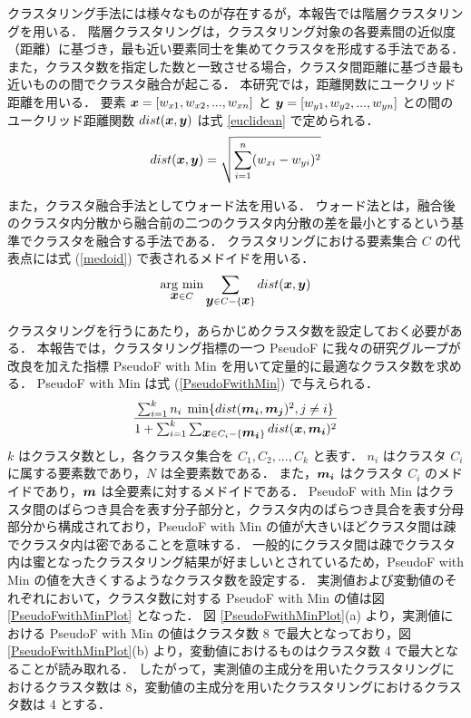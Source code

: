\documentclass[technicalreport]{ieicej}
\begin{document}
クラスタリング手法には様々なものが存在するが，本報告では階層クラスタリングを用いる\cite{fraley1998many}．
階層クラスタリングは，クラスタリング対象の各要素間の近似度（距離）に基づき，最も近い要素同士を集めてクラスタを形成する手法である．
また，クラスタ数を指定した数と一致させる場合，クラスタ間距離に基づき最も近いものの間でクラスタ融合が起こる．
本研究では，距離関数にユークリッド距離を用いる．
要素 $\mbox{\boldmath $x$} = [w_{x1},w_{x2},...,w_{xn}]$ と $\mbox{\boldmath $y$} = [w_{y1},w_{y2},...,w_{yn}]$ との間のユークリッド距離関数 $dist(\mbox{\boldmath $x$},\mbox{\boldmath $y$})$ は式 \ref{euclidean} で定められる．
\begin{equation}
dist(\mbox{\boldmath $x$},\mbox{\boldmath $y$}) = \sqrt{\sum^n_{i=1}( w_{xi} - w_{yi} )^2}
\label{euclidean}
\end{equation}

また，クラスタ融合手法としてウォード法\cite{murtagh2014ward}を用いる．
ウォード法とは，融合後のクラスタ内分散から融合前の二つのクラスタ内分散の差を最小とするという基準でクラスタを融合する手法である．
クラスタリングにおける要素集合 $C$ の代表点には式 (\ref{medoid}) で表されるメドイド\cite{mouratidis2005medoid}を用いる．
\begin{equation}
\mathop{\rm arg~min}\limits_{\mbox{\boldmath $x$} \in C} \sum_{\mbox{\boldmath $y$} \in C - \{\mbox{\boldmath $x$}\}} dist(\mbox{\boldmath $x$},\mbox{\boldmath $y$})
\label{medoid}
\end{equation}

クラスタリングを行うにあたり，あらかじめクラスタ数を設定しておく必要がある．
本報告では，クラスタリング指標の一つ PseudoF\cite{liu2010understanding} に我々の研究グループが改良を加えた指標 PseudoF with Min \cite{kanajiri}を用いて定量的に最適なクラスタ数を求める．
PseudoF with Min は式 (\ref{PseudoFwithMin}) で与えられる．
\begin{equation}
\frac{\sum^k_{i=1} n_{i}\hspace{0.1cm} \min \{ dist(\mbox{\boldmath $m_{i}$},\mbox{\boldmath $m_j$})^2,j \neq i \}}{1 + \sum^k_{i=1} \sum_{\mbox{\boldmath $x$} \in C_i - \{\mbox{\boldmath $m_i$}\}} dist(\mbox{\boldmath $x$},\mbox{\boldmath $m_{i}$})^2}
\label{PseudoFwithMin}
\end{equation}
$k$ はクラスタ数とし，各クラスタ集合を $C_1,C_2,...,C_k$ と表す．
$n_i$ はクラスタ $C_i$ に属する要素数であり，$N$ は全要素数である．
また，$\mbox{\boldmath $m_i$}$ はクラスタ $C_i$ のメドイドであり，$\mbox{\boldmath $m$}$ は全要素に対するメドイドである．
PseudoF with Min はクラスタ間のばらつき具合を表す分子部分と，クラスタ内のばらつき具合を表す分母部分から構成されており，PseudoF with Min の値が大きいほどクラスタ間は疎でクラスタ内は密であることを意味する．
一般的にクラスタ間は疎でクラスタ内は蜜となったクラスタリング結果が好ましいとされているため，PseudoF with Min の値を大きくするようなクラスタ数を設定する．
実測値および変動値のそれぞれにおいて，クラスタ数に対する PseudoF with Min の値は図 \ref{PseudoFwithMinPlot} となった．
図 \ref{PseudoFwithMinPlot}(a) より，実測値における PseudoF with Min の値はクラスタ数 8 で最大となっており，図 \ref{PseudoFwithMinPlot}(b) より，変動値におけるものはクラスタ数 4 で最大となることが読み取れる．
したがって，実測値の主成分を用いたクラスタリングにおけるクラスタ数は 8，変動値の主成分を用いたクラスタリングにおけるクラスタ数は 4 とする．
\end{document}
